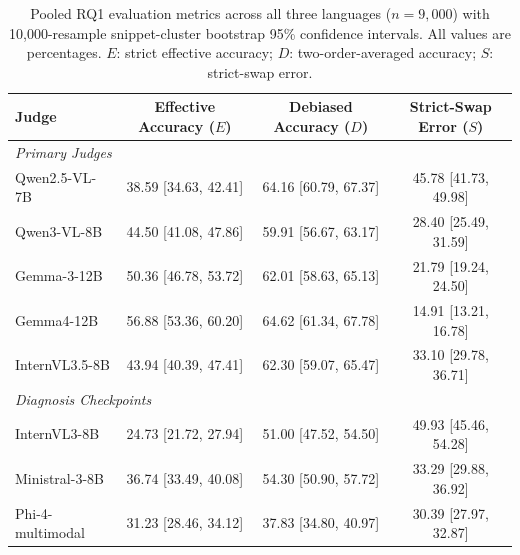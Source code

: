 \begin{table}[t]
\centering
\caption{Pooled RQ1 evaluation metrics across all three languages ($n=9,000$) with 10,000-resample snippet-cluster bootstrap 95\% confidence intervals. All values are percentages. $E$: strict effective accuracy; $D$: two-order-averaged accuracy; $S$: strict-swap error.}
\label{tab:vlm_tab_rq1_intervals}
\small
\begin{tabular}{lccc}
\toprule
Judge & Effective Accuracy ($E$) & Debiased Accuracy ($D$) & Strict-Swap Error ($S$) \\
\midrule
\multicolumn{4}{l}{\textit{Primary Judges}} \\
Qwen2.5-VL-7B & 38.59 [34.63, 42.41] & 64.16 [60.79, 67.37] & 45.78 [41.73, 49.98] \\
Qwen3-VL-8B & 44.50 [41.08, 47.86] & 59.91 [56.67, 63.17] & 28.40 [25.49, 31.59] \\
Gemma-3-12B & 50.36 [46.78, 53.72] & 62.01 [58.63, 65.13] & 21.79 [19.24, 24.50] \\
Gemma4-12B & 56.88 [53.36, 60.20] & 64.62 [61.34, 67.78] & 14.91 [13.21, 16.78] \\
InternVL3.5-8B & 43.94 [40.39, 47.41] & 62.30 [59.07, 65.47] & 33.10 [29.78, 36.71] \\
\midrule
\multicolumn{4}{l}{\textit{Diagnosis Checkpoints}} \\
InternVL3-8B & 24.73 [21.72, 27.94] & 51.00 [47.52, 54.50] & 49.93 [45.46, 54.28] \\
Ministral-3-8B & 36.74 [33.49, 40.08] & 54.30 [50.90, 57.72] & 33.29 [29.88, 36.92] \\
Phi-4-multimodal & 31.23 [28.46, 34.12] & 37.83 [34.80, 40.97] & 30.39 [27.97, 32.87] \\
\bottomrule
\end{tabular}
\end{table}
